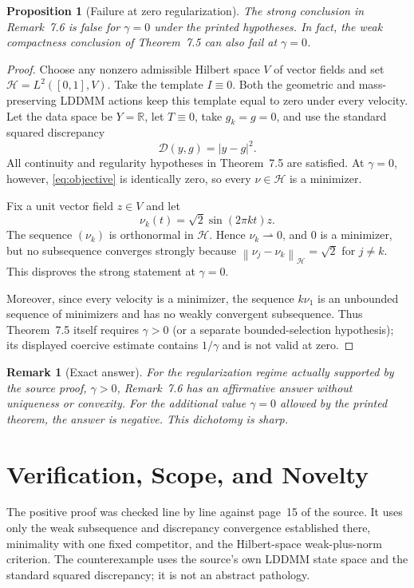 \documentclass[11pt]{article}
\newtheorem{proposition}{Proposition}
\newtheorem{remark}{Remark}
\newcommand{\Hspace}{\mathcal H}
\newcommand{\Ddisc}{\mathcal D}
\newcommand{\norm}[1]{\left\lVert#1\right\rVert}
\begin{document}
\begin{proposition}[Failure at zero regularization]\label{prop:zero}
The strong conclusion in Remark~7.6 is false for $\gamma=0$ under the printed
hypotheses.  In fact, the weak compactness conclusion of Theorem~7.5 can also
fail at $\gamma=0$.
\end{proposition}

\begin{proof}
Choose any nonzero admissible Hilbert space $V$ of vector fields and set
$\Hspace=L^2([0,1],V)$.  Take the template $I\equiv0$.  Both the geometric and
mass-preserving LDDMM actions keep this template equal to zero under every
velocity.  Let the data space be $Y=\mathbb R$, let $T\equiv0$, take
$g_k=g=0$, and use the standard squared discrepancy
\[
                         \Ddisc(y,g)=|y-g|^2.
\]
All continuity and regularity hypotheses in Theorem~7.5 are satisfied.  At
$\gamma=0$, however, \eqref{eq:objective} is identically zero, so every
$\nu\in\Hspace$ is a minimizer.

Fix a unit vector field $z\in V$ and let
\[
                 \nu_k(t)=\sqrt2\sin(2\pi kt)z.
\]
The sequence $(\nu_k)$ is orthonormal in $\Hspace$.  Hence
$\nu_k\rightharpoonup0$, and $0$ is a minimizer, but no subsequence converges
strongly because
$\norm{\nu_j-\nu_k}_{\Hspace}=\sqrt2$ for $j\neq k$.  This disproves the
strong statement at $\gamma=0$.

Moreover, since every velocity is a minimizer, the sequence $k\nu_1$ is an
unbounded sequence of minimizers and has no weakly convergent subsequence.
Thus Theorem~7.5 itself requires $\gamma>0$ (or a separate bounded-selection
hypothesis); its displayed coercive estimate contains $1/\gamma$ and is not
valid at zero.
\end{proof}

\begin{remark}[Exact answer]
For the regularization regime actually supported by the source proof,
$\gamma>0$, Remark~7.6 has an affirmative answer without uniqueness or
convexity.  For the additional value $\gamma=0$ allowed by the printed theorem,
the answer is negative.  This dichotomy is sharp.
\end{remark}

\section*{Verification, Scope, and Novelty}

The positive proof was checked line by line against page~15 of the source.
It uses only the weak subsequence and discrepancy convergence established
there, minimality with one fixed competitor, and the Hilbert-space
weak-plus-norm criterion.  The counterexample uses the source's own LDDMM
state space and the standard squared discrepancy; it is not an abstract
pathology.
\end{document}
